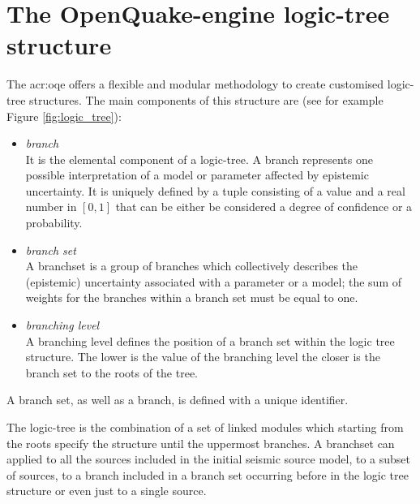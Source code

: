 \section{The OpenQuake-engine logic-tree structure}
\label{sec:lr_intro}
The \gls{acr:oqe} offers a flexible and modular methodology 
to create customised logic-tree structures. 
%
The main components of this structure are (see for example Figure 
\ref{fig:logic_tree}):
%
\begin{itemize}
    \item \emph{branch} \hfill \\
        It is the elemental component of a logic-tree. A branch
        represents one possible interpretation of a model or parameter 
        affected by epistemic uncertainty. It is uniquely defined by a tuple
        consisting of a value and a real number in $[0,1]$ that can be either
        be considered a degree of confidence or a probability.
    \item \emph{branch set} \hfill \\
        A \gls{branchset} is a group of branches which collectively 
        describes the (epistemic) uncertainty associated with a 
        parameter or a model; the sum of weights for the branches 
        within a branch set must be equal to one. 
    \item \emph{branching level} \hfill \\
        A branching level defines the position of a branch set within 
        the logic tree structure. The lower is the value of the 
        branching level the closer is the branch set to the roots of 
        the tree.
\end{itemize}
A branch set, as well as a \gls{branch}, is defined with a unique 
identifier. 

The logic-tree is the combination of a set of linked modules which 
starting from the roots specify the structure until the uppermost 
branches. 
%
A \gls{branchset} can applied to all the sources included in the initial 
seismic source model, to a subset of sources, to a branch included in a 
branch set occurring before in the logic tree structure or even just to 
a single source. 

